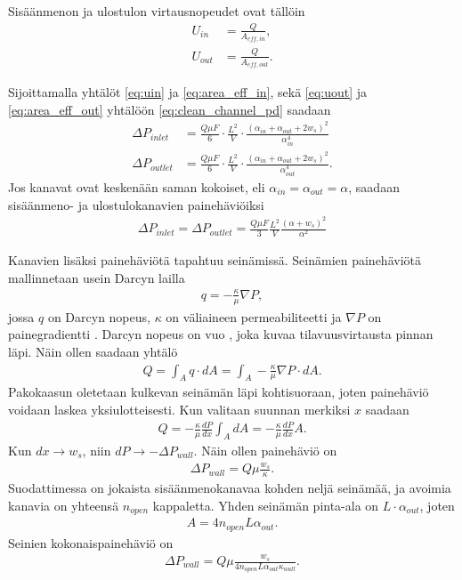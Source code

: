 Sisäänmenon ja ulostulon virtausnopeudet ovat tällöin
\begin{align}
    U_{in} &= \frac{Q}{A_{eff, in}}, \label{eq:uin}\\
    U_{out} &= \frac{Q}{A_{eff, out}}. \label{eq:uout}
\end{align}

Sijoittamalla yhtälöt \eqref{eq:uin} ja \eqref{eq:area_eff_in}, sekä \eqref{eq:uout} ja \eqref{eq:area_eff_out} yhtälöön \eqref{eq:clean_channel_pd} saadaan
\begin{align}
    \Delta P_{inlet} &=\frac{Q \mu F}{6}\cdot \frac{L^2}{V} \cdot \frac{(\alpha_{in}+\alpha_{out}+2w_s)^2}{\alpha_{in}^4} \label{eq:DeltaP_inlet_clean}
    \\ 
    \Delta P_{outlet} &=\frac{Q \mu F}{6}\cdot \frac{L^2}{V} \cdot \frac{(\alpha_{in}+\alpha_{out}+2w_s)^2}{\alpha_{out}^4}.
\end{align}
Jos kanavat ovat keskenään saman kokoiset, eli  \(\alpha_{in}=\alpha_{out}=\alpha\), saadaan sisäänmeno- ja ulostulokanavien painehäviöiksi 
\begin{align}
    \Delta P_{inlet}= \Delta P_{outlet} =  \frac{Q\mu F}{3} \frac{L^2}{V}\frac{(\alpha+w_s)^2}{\alpha^2}
\end{align}


Kanavien lisäksi painehäviötä tapahtuu seinämissä. Seinämien painehäviötä mallinnetaan usein Darcyn lailla \cite{dieselnet_wall_flow_monolith}\cite{Konstandopoulos1989_wallflow}
\begin{align}
    q = - \frac{\kappa}{\mu}\nabla P,
\end{align}
jossa \(q\) on Darcyn nopeus, \(\kappa\) on väliaineen permeabiliteetti ja \(\nabla P\) on painegradientti \cite{feder2021_porous}. 
 Darcyn nopeus on vuo \cite{reible_env_eng}, joka kuvaa tilavuusvirtausta pinnan läpi. Näin ollen saadaan yhtälö
\begin{align}
    Q = \int_A q \cdot dA = \int_A - \frac{\kappa}{\mu} \nabla P \cdot dA.
\end{align}
Pakokaasun oletetaan kulkevan seinämän läpi kohtisuoraan, joten painehäviö voidaan laskea yksiulotteisesti. Kun valitaan suunnan merkiksi \(x\) saadaan
\begin{align}
    Q = - \frac{\kappa}{\mu} \frac{dP}{dx} \int_A dA = - \frac{\kappa}{\mu} \frac{dP}{dx} A.
\end{align}
Kun \(dx \to w_s\), niin \(dP \to -\Delta P_{wall}\). Näin ollen painehäviö on
\begin{align}
    \Delta P_{wall} = Q\mu \frac{w_s}{\kappa}.
\end{align}
Suodattimessa on jokaista sisäänmenokanavaa kohden neljä seinämää, ja avoimia kanavia on yhteensä \(n_{open}\) kappaletta. Yhden seinämän pinta-ala on \(L\cdot \alpha_{out}\), joten 
\begin{align}
    A = 4 n_{open} L \alpha_{out}.
\end{align}
Seinien kokonaispainehäviö on
\begin{align}
    \Delta P_{wall} =  Q \mu \frac{w_s}{4 n_{open} L  \alpha_{out}  \kappa_{wall}}.
\end{align}

